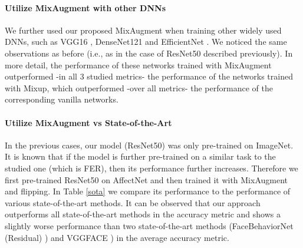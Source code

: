 \documentclass[10pt,twocolumn,letterpaper]{article}
\begin{document}
 

\paragraph{Utilize MixAugment with other DNNs} We further used our proposed MixAugment when training other widely used DNNs, such as VGG16 \cite{simonyan2014very}, DenseNet121 \cite{huang2017densely} and EfficientNet \cite{tan2019efficientnet}. We noticed the same observations as before (i.e., as in the case of ResNet50 described previously). In more detail, the performance of these  networks trained with MixAugment outperformed -in all 3 studied metrics- the performance of the networks trained with Mixup, which outperformed -over all metrics- the performance of the corresponding vanilla networks. 




\paragraph{Utilize MixAugment vs State-of-the-Art} In the previous cases, our model (ResNet50) was only pre-trained on ImageNet. It is known that if the model is further pre-trained on a similar task to the studied one (which is FER), then its performance further increases. Therefore we first pre-trained ResNet50 on AffectNet and then trained it with MixAugment and flipping. In Table \ref{sota} we compare its performance to the performance of various state-of-the-art methods. 
It can be observed that our approach outperforms all state-of-the-art methods in the accuracy metric and shows a slightly worse performance than two state-of-the-art methods (FaceBehaviorNet (Residual) \cite{kollias2021distribution}) and VGGFACE \cite{kollias2020deep}) in the average accuracy metric.
\end{document}
